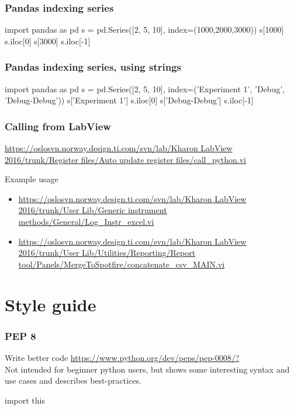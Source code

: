 \documentclass[12pt]{beamer}
\begin{document}
\begin{frame}[fragile]
\end{frame}

\begin{frame}[fragile]
\frametitle{Pandas indexing series}
\begin{pyconsole}
import pandas as pd
s = pd.Series([2, 5, 10], index=(1000,2000,3000))
s[1000]
s.iloc[0]
s[3000]
s.iloc[-1]
\end{pyconsole}
\end{frame}

\begin{frame}[fragile]
\frametitle{Pandas indexing series, using strings}
\begin{pyconsole}
import pandas as pd
s = pd.Series([2, 5, 10], index=('Experiment 1',
					'Debug',
					'Debug-Debug'))
s['Experiment 1']
s.iloc[0]
s['Debug-Debug']
s.iloc[-1]
\end{pyconsole}
\end{frame}

\begin{frame}[fragile]
\frametitle{Calling from LabView}
\url{https://oslosvn.norway.design.ti.com/svn/lab/Kharon LabView 2016/trunk/Register files/Auto update register files/call_python.vi}

\vspace{1cm}
Example usage
\begin{itemize}
\item \url{https://oslosvn.norway.design.ti.com/svn/lab/Kharon LabView 2016/trunk/User Lib/Generic instrument methods/General/Log_Instr_excel.vi}
\item \url{https://oslosvn.norway.design.ti.com/svn/lab/Kharon LabView 2016/trunk/User Lib/Utilities/Reporting/Report tool/Panels/MergeToSpotfire/concatenate_csv_MAIN.vi}
\end{itemize}
\end{frame}

\section{Style guide}
\begin{frame}[fragile]
\frametitle{PEP 8}
Write better code
\url{https://www.python.org/dev/peps/pep-0008/?}\\
Not intended for beginner python users, but shows some interesting syntax and use cases and
describes best-practices.

\end{frame}

\begin{frame}[fragile]
\begin{footnotesize}
\begin{pyconsole}
import this
\end{pyconsole}
\end{footnotesize}
\end{frame}
\end{document}
